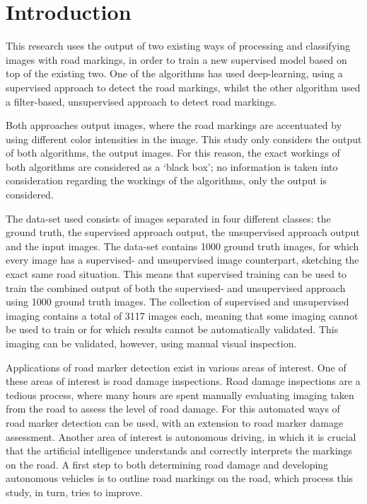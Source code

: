 
\section{Introduction}\label{sec:introduction}
This research uses the output of two existing ways of processing and classifying images with road markings, in order to train a new supervised model based on top of the existing two. One of the algorithms has used deep-learning, using a supervised approach to detect the road markings, whilst the other algorithm used a filter-based, unsupervised approach to detect road markings.

Both approaches output images, where the road markings are accentuated by using different color intensities in the image. This study only considers the output of both algorithms, the output images. For this reason, the exact workings of both algorithms are considered as a `black box'; no information is taken into consideration regarding the workings of the algorithms, only the output is considered.


The data-set used consists of images separated in four different classes: the ground truth, the supervised approach output, the unsupervised approach output and the input images. The data-set contains 1000 ground truth images, for which every image has a supervised- and unsupervised image counterpart, sketching the exact same road situation. This means that supervised training can be used to train the combined output of both the supervised- and unsupervised approach using 1000 ground truth images. The collection of supervised and unsupervised imaging contains a total of 3117 images each, meaning that some imaging cannot be used to train or for which results cannot be automatically validated. This imaging can be validated, however, using manual visual inspection.

Applications of road marker detection exist in various areas of interest. One of these areas of interest is road damage inspections. Road damage inspections are a tedious process, where many hours are spent manually evaluating imaging taken from the road to assess the level of road damage. For this automated ways of road marker detection can be used, with an extension to road marker damage assessment. Another area of interest is autonomous driving, in which it is crucial that the artificial intelligence understands and correctly interprets the markings on the road. A first step to both determining road damage and developing autonomous vehicles is to outline road markings on the road, which process this study, in turn, tries to improve.

